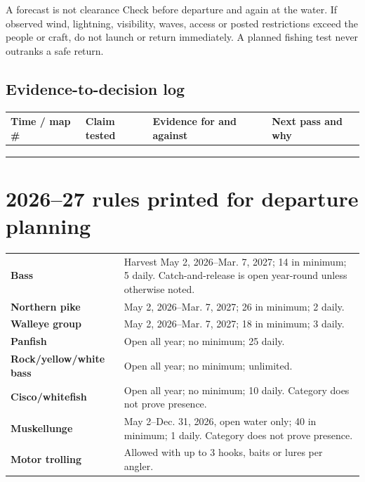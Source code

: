 \begin{teloshazard}{A forecast is not clearance}
Check before departure and again at the water. If observed wind, lightning,
visibility, waves, access or posted restrictions exceed the people or craft,
do not launch or return immediately. A planned fishing test never outranks a
safe return.
\end{teloshazard}

\subsection{Evidence-to-decision log}
\begin{tabularx}{\linewidth}{@{}p{.13\linewidth}p{.18\linewidth}X X@{}}
\toprule
Time / map \# & Claim tested & Evidence for and against & Next pass and why\\
\midrule
\rule{0pt}{1.2cm}&&&\\ \midrule
\rule{0pt}{1.2cm}&&&\\ \midrule
\rule{0pt}{1.2cm}&&&\\
\bottomrule
\end{tabularx}

\newpage
\section{2026--27 rules printed for departure planning}

\begin{tabularx}{\linewidth}{@{}>{\bfseries}p{.22\linewidth}X@{}}
\toprule
Bass & Harvest May 2, 2026--Mar. 7, 2027; 14 in minimum; 5 daily.
Catch-and-release is open year-round unless otherwise noted.\\
Northern pike & May 2, 2026--Mar. 7, 2027; 26 in minimum; 2 daily.\\
Walleye group & May 2, 2026--Mar. 7, 2027; 18 in minimum; 3 daily.\\
Panfish & Open all year; no minimum; 25 daily.\\
Rock/yellow/white bass & Open all year; no minimum; unlimited.\\
Cisco/whitefish & Open all year; no minimum; 10 daily. Category does not prove presence.\\
Muskellunge & May 2--Dec. 31, 2026, open water only; 40 in minimum; 1 daily.
Category does not prove presence.\\
Motor trolling & Allowed with up to 3 hooks, baits or lures per angler.\\
\bottomrule
\end{tabularx}


